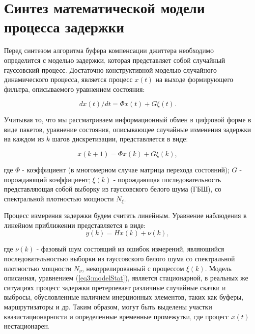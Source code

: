 \section{Синтез математической модели процесса задержки} \label{sect3_1}
Перед синтезом алгоритма буфера компенсации джиттера необходимо определится с моделью задержки, которая представляет собой случайный гауссовский процесс. 
Достаточно конструктивной моделью случайного динамического процесса, является процесс $x(t)$ на выходе формирующего фильтра, описываемого уравнением состояния:

\begin{equation}\label{eq3:modelStatDif}
dx(t)/dt=\Phi x(t)+G\xi(t).
\end{equation}

Учитывая то, что мы рассматриваем информационный обмен в цифровой форме в виде пакетов, уравнение состояния, описывающее случайные изменения задержки на каждом из $k$ шагов дискретизации, представляется в виде:

\begin{equation}\label{eq3:modelStat}
x(k+1)=\Phi x(k)+G\xi(k),
\end{equation}

\noindent где $\Phi$ - коэффициент (в многомерном случае матрица перехода состояний); $G$ - порождающий коэффициент; $\xi(k)$ - порождающая последовательность представляющая собой выборку из гауссовского белого шума (ГБШ), со спектральной плотностью мощности $N_\xi$.

Процесс измерения задержки будем считать линейным. Уравнение наблюдения в линейном приближении представляется в виде:
\begin{equation}\label{eq3:Estim}
y(k)=Hx(k)+\nu(k),
\end{equation}

\noindent где $\nu(k)$ - фазовый шум состоящий из ошибок измерений, являющийся последовательностью выборки из гауссовского белого шума со спектральной плотностью мощности $N_\nu$, некоррелированный с процессом $\xi(k)$. 
Модель описанная, уравнением (\ref{eq3:modelStat}), является стационарной, в реальных же ситуациях процесс задержки претерпевает различные случайные скачки и выбросы, обусловленные наличием инерционных элементов, таких как буферы, маршрутизаторы и др. Таким образом, могут быть выделены участки квазистационарности и определенные временные промежутки, где процесс $x(t)$ нестационарен.

